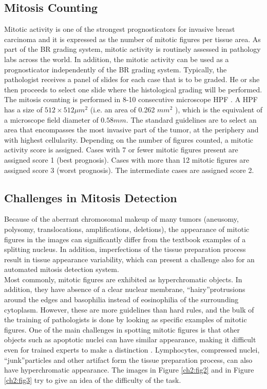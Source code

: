 \subsection{Mitosis Counting}
Mitotic activity is one of the strongest prognosticators for invasive breast carcinoma and it
is expressed as the number of mitotic figures per tissue area. As part of the \Gls{BR} grading system, mitotic activity is
routinely assessed in pathology labs across the world. In addition, the mitotic activity
can be used as a prognosticator independently of the \Gls{BR} grading system.
Typically, the pathologist receives a panel of slides for each case that is to be graded. He
or she then proceeds to select one slide where the histological grading will be
performed. The mitosis counting is performed in 8-10 consecutive microscope \Gls{HPF} \cite{breastCancerMitosisPCA_ICA}. 
A HPF has a size of $512 \times 512 \mu m^{2}$ (i.e. an area of 0.262 $mm^{2}$ ), which is the equivalent of a microscope field diameter of $0.58mm$.
The standard guidelines are to select an area that encompasses the most invasive
part of the tumor, at the periphery and with highest cellularity. Depending on the
number of figures counted, a mitotic activity score is assigned. Cases with 7 or fewer
mitotic figures present are assigned score 1 (best prognosis). Cases with more than 12
mitotic figures are assigned score 3 (worst prognosis). The intermediate cases are
assigned score 2.

\subsection{Challenges in Mitosis Detection}
Because of the aberrant chromosomal makeup of many tumors (aneusomy, polysomy,
translocations, amplifications, deletions), the appearance of mitotic figures in the
images can significantly differ from the textbook examples of a splitting nucleus\cite{mitosisDetectBreastCancer01}. In
addition, imperfections of the tissue preparation process result in tissue appearance
variability, which can present a challenge also for an automated mitosis detection system.\\
Most commonly, mitotic figures are exhibited as hyperchromatic objects. In addition,
they have absence of a clear nuclear membrane, \textquotedblleft hairy\textquotedblright protrusions around the edges
and basophilia instead of eosinophilia of the surrounding cytoplasm. However, these are
more guidelines than hard rules, and the bulk of the training of pathologists is done by
looking as specific examples of mitotic figures.
One of the main challenges in spotting mitotic figures is that other objects such as
apoptotic nuclei can have similar appearance, making it
difficult even for trained experts to make a distinction \cite{mitosisDetectionLearningBased}. Lymphocytes, compressed
nuclei, \textquotedblleft junk\textquotedblright particles and other artifact form the tissue preparation process, can also
have hyperchromatic appearance.
The images in Figure \ref{ch2:fig2} and in Figure \ref{ch2:fig3} try to give an idea of the difficulty of the task.

